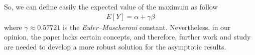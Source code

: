 

So, we can define easily the expected value of the maximum as follow
\begin{align*}
	E[Y] = \alpha + \gamma \beta
\end{align*}
where $\gamma \approx 0.57721$ is the \textit{Euler–Mascheroni} constant. Nevertheless, in our opinion, the paper lacks certain concepts, and therefore, further work and study are needed to develop a more robust solution for the asymptotic results.
